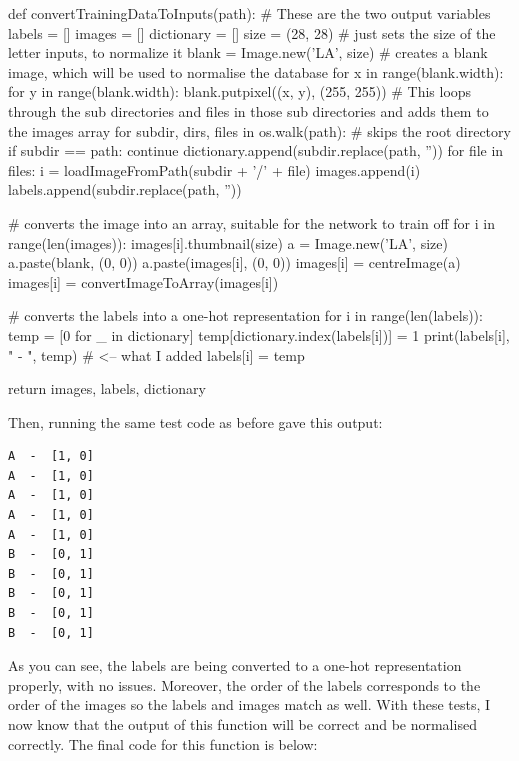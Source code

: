 \documentclass{report}
\begin{document}
\begin{python}
def convertTrainingDataToInputs(path):
    # These are the two output variables
    labels = []
    images = []
    dictionary = []
    size = (28, 28)  # just sets the size of the letter inputs, to normalize it
    blank = Image.new('LA', size)  # creates a blank image, which will be used to normalise the database
    for x in range(blank.width):
        for y in range(blank.width):
            blank.putpixel((x, y), (255, 255))
    # This loops through the sub directories and files in those sub directories and adds them to the images array
    for subdir, dirs, files in os.walk(path):
        # skips the root directory
        if subdir == path:
            continue
        dictionary.append(subdir.replace(path, ''))
        for file in files:
            i = loadImageFromPath(subdir + '/' + file)
            images.append(i)
            labels.append(subdir.replace(path, ''))

    # converts the image into an array, suitable for the network to train off
    for i in range(len(images)):
        images[i].thumbnail(size)
        a = Image.new('LA', size)
        a.paste(blank, (0, 0))
        a.paste(images[i], (0, 0))
        images[i] = centreImage(a)
        images[i] = convertImageToArray(images[i])

    # converts the labels into a one-hot representation
    for i in range(len(labels)):
        temp = [0 for _ in dictionary]
        temp[dictionary.index(labels[i])] = 1
        print(labels[i], " - ", temp)  # <-- what I added
        labels[i] = temp
        
    return images, labels, dictionary
\end{python}
Then, running the same test code as before gave this output:
\begin{verbatim}
A  -  [1, 0]
A  -  [1, 0]
A  -  [1, 0]
A  -  [1, 0]
A  -  [1, 0]
B  -  [0, 1]
B  -  [0, 1]
B  -  [0, 1]
B  -  [0, 1]
B  -  [0, 1]
\end{verbatim}
As you can see, the labels are being converted to a one-hot representation properly, with no issues. Moreover, the order of the labels corresponds to the order of the images so the labels and images match as well.
\newline
With these tests, I now know that the output of this function will be correct and be normalised correctly.
\newline
The final code for this function is below:
\end{document}
